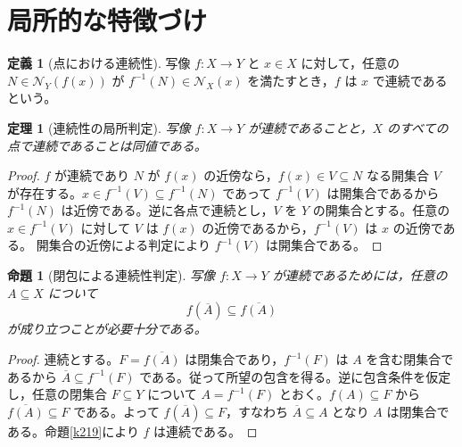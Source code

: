 \documentclass[a5paper,10pt,dvipdfmx]{jsarticle}
\theoremstyle{definition}
\newtheorem{defn}[ruledef]{定義}
\theoremstyle{plain}
\newtheorem{prop}[ruledef]{命題}
\newtheorem{thm}[ruledef]{定理}
\newcommand{\GenronRefText}[2]{#2}
\begin{document}
\section{局所的な特徴づけ}
\begin{defn}[点における連続性]\label{k220}
写像 $f:X\to Y$ と $x\in X$ に対して，任意の $N\in\mathcal N_Y(f(x))$ が $f^{-1}(N)\in\mathcal N_X(x)$ を満たすとき，$f$ は $x$ で連続であるという。
\end{defn}
\begin{thm}[連続性の局所判定]\label{k221}
写像 $f:X\to Y$ が連続であることと，$X$ のすべての点で連続であることは同値である。
\end{thm}
\begin{proof}
$f$ が連続であり $N$ が $f(x)$ の近傍なら，$f(x)\in V\subseteq N$ なる開集合 $V$ が存在する。$x\in f^{-1}(V)\subseteq f^{-1}(N)$ であって $f^{-1}(V)$ は開集合であるから $f^{-1}(N)$ は近傍である。逆に各点で連続とし，$V$ を $Y$ の開集合とする。任意の $x\in f^{-1}(V)$ に対して $V$ は $f(x)$ の近傍であるから，$f^{-1}(V)$ は $x$ の近傍である。 \GenronRefText{K-000196}{開集合の近傍による判定}により $f^{-1}(V)$ は開集合である。
\end{proof}
\begin{prop}[閉包による連続性判定]\label{k222}
写像 $f:X\to Y$ が連続であるためには，任意の $A\subseteq X$ について
\[
 f(\overline A)\subseteq\overline{f(A)}
\]
が成り立つことが必要十分である。
\end{prop}
\begin{proof}
連続とする。$F=\overline{f(A)}$ は閉集合であり，$f^{-1}(F)$ は $A$ を含む閉集合であるから $\overline A\subseteq f^{-1}(F)$ である。従って所望の包含を得る。逆に包含条件を仮定し，任意の閉集合 $F\subseteq Y$ について $A=f^{-1}(F)$ とおく。$f(A)\subseteq F$ から $\overline{f(A)}\subseteq F$ である。よって $f(\overline A)\subseteq F$，すなわち $\overline A\subseteq A$ となり $A$ は閉集合である。命題\ref{k219}により $f$ は連続である。
\end{proof}
\end{document}
